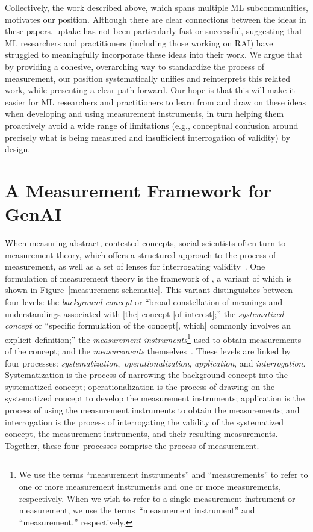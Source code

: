 \documentclass{article}
\begin{document}
Collectively, the work described above, which spans multiple ML subcommunities, motivates our position. Although there are clear connections between the ideas in these papers, uptake has not been particularly fast or successful, suggesting that ML researchers and practitioners (including those working on RAI) have struggled to meaningfully incorporate these ideas into their work. We argue that by providing a cohesive, overarching way to standardize the process of measurement, our position systematically unifies and reinterprets this related work, while presenting a clear path forward. Our hope is that this will make it easier for ML researchers and practitioners to learn from and draw on these ideas when developing and using measurement instruments, in turn helping them proactively avoid a wide range of limitations (e.g., conceptual confusion around precisely what is being measured and insufficient interrogation of validity) by design.

\section{A Measurement Framework for GenAI}
\label{sec:framework}

When measuring abstract, contested 
concepts, social scientists often turn to measurement theory, which offers a structured approach to the process of measurement, as well as a set of lenses for interrogating validity~\citep[e.g.,][]{adcock2001measurement,cronbach1955construct,messick1996validity}. One formulation of measurement theory is the framework of \citet{adcock2001measurement},
a variant of which is shown in Figure~\ref{measurement-schematic}. This variant distinguishes between four levels: the \emph{background concept} or ``broad constellation of meanings and understandings associated with [the] concept [of interest];'' the \emph{systematized concept} or ``specific formulation of the concept[, which] commonly involves an explicit definition;'' the \emph{measurement instruments}\footnote{We use the terms ``measurement instruments'' and ``measurements'' to refer to one or more measurement instruments and one or more measurements, respectively. When we wish to refer to a single measurement instrument or measurement, we use the terms~``measurement instrument'' and ``measurement,'' respectively.} 
used to obtain measurements of the concept; and the \emph{measurements} themselves~\citep{adcock2001measurement}. These levels are linked by four processes: \emph{systematization},~\emph{operationalization}, \emph{application}, and \emph{interrogation}. Systematization is the process of narrowing the background concept into the systematized concept; operationalization is the process of drawing on the systematized concept to develop the measurement instruments; application is the process of using the measurement instruments to obtain the measurements; and interrogation is the process of interrogating the validity of the systematized concept, the measurement instruments, and their resulting measurements. Together, these four~processes comprise the process of measurement.
\end{document}

